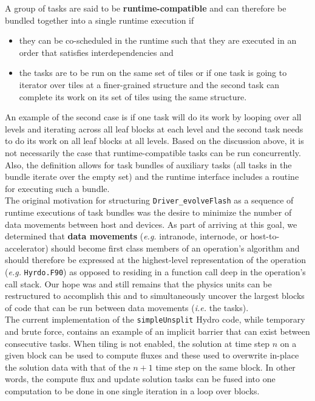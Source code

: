\documentclass{article}
\begin{document}
A group of tasks are said to be \textbf{runtime-compatible} and can therefore be
bundled together into a single runtime execution if
\begin{itemize}
\item{they can be co-scheduled in the runtime such that they are executed in an
order that satisfies interdependencies and}
\item{the tasks are to be run on the same set of tiles or if one task is going
to iterator over tiles at a finer-grained structure and the second task can
complete its work on its set of tiles using the same structure.}
\end{itemize}
An example of the second case is if one task
will do its work by looping over all levels and iterating across all leaf blocks
at each level and the second task needs to do its work on all leaf blocks at all
levels.  Based on the discussion above, it is not necessarily the case that
runtime-compatible tasks can be run concurrently.  Also, the definition allows
for task bundles of auxiliary tasks (all tasks in the bundle iterate over the
empty set) and the runtime interface includes a routine for executing such a
bundle.\\

The original motivation for structuring \texttt{Driver\_evolveFlash} as a
sequence of runtime executions of task bundles was the desire to minimize the
number of data movements between host and devices.  As part of arriving at this
goal, we determined that \textbf{data movements} (\textit{e.g.} intranode,
internode, or host-to-accelerator) should become first class members of an
operation's algorithm and should therefore be expressed at the highest-level
representation of the operation (\textit{e.g.} \texttt{Hyrdo.F90}) as opposed
to residing in a function call deep in the operation's call stack.  Our hope was and still
remains that the physics units can be restructured to accomplish this and to
simultaneously uncover the largest blocks of code that can be run between data
movements (\textit{i.e.} the tasks).\\

The current implementation of the \texttt{simpleUnsplit} Hydro code, while temporary and
brute force, contains an example of an implicit barrier that can exist between
consecutive tasks.  When tiling is not enabled, the solution at time step $n$ on
a given block can be used to compute fluxes and these used to overwrite in-place
the solution data with that of the $n+1$ time step on the same block.  In other
words, the compute flux and update solution tasks can be fused into one
computation to be done in one single iteration in a loop over blocks.\\
\end{document}
